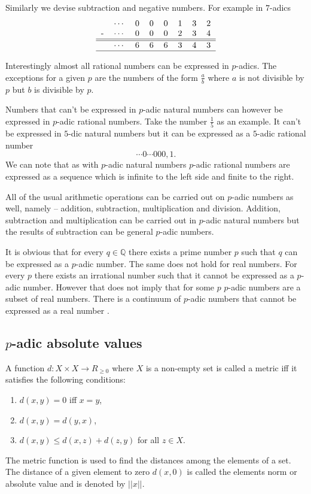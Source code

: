 \documentclass{llncs}
\begin{document}
Similarly we devise subtraction and negative numbers. For example in $7$-adics
\[
\begin{tabular}{rrrrrrrrr|}
&$\cdots$ &0 &0 &0 &1 &3 &2\\
-&$\cdots$ &0 &0 &0 &2 &3 &4\\
\hline
\hline
&$\cdots$ &6 &6 &6 &3 &4 &3\\
\hline
\end{tabular}
\]

Interestingly almost all rational numbers can be expressed in $p$-adics. The exceptions for a given $p$ are the numbers of the form $\frac{a}{b}$  where $a$ is not divisible by $p$ but $b$ is divisible by $p$.

Numbers that can't be expressed in $p$-adic natural numbers can however be expressed in $p$-adic rational numbers. Take the number $\frac{1}{5}$ as an example. It can't be expressed in $5$-dic natural numbers but it can be expressed as a $5$-adic rational number
\[
\cdots 0 \cdots 000,1.
\]
We can note that as with $p$-adic natural numbers $p$-adic rational numbers are expressed as a sequence which is infinite to the left side and finite to the right.

All of the usual arithmetic operations can be carried out on $p$-adic numbers as well, namely -- addition, subtraction, multiplication and division. Addition, subtraction and multiplication can be carried out in $p$-adic natural numbers %
but the results of subtraction can be general $p$-adic numbers.

It is obvious that for every $q \in \mathbb{Q}$ there exists a prime number $p$ such that $q$ can be expressed as a $p$-adic number. The same does not hold for real numbers. For every $p$ there exists an irrational number such that it cannot be expressed as a $p$-adic number. However that does not imply that for some $p$ $p$-adic numbers are a subset of real numbers. There is a continuum of $p$-adic numbers %
that cannot be expressed as a real number \citep{Freivalds2012}.

\subsection{$p$-adic absolute values}
A function $d: X \times X \rightarrow R_{\geq 0}$ where $X$ is a non-empty set is called a metric iff it satisfies the following conditions:
\begin{enumerate}
\item $d(x,y) = 0$ iff $x = y$,
\item $d(x,y) = d(y,x)$,
\item $d(x,y) \leq d(x,z) + d(z,y)$ for all $z \in X$.
\end{enumerate}
The metric function is used to find the distances among the elements of a set. The distance of a given element to zero $d(x,0)$ is called the elements norm or absolute value and is denoted by $||x||$.
\end{document}
